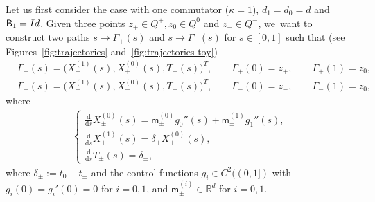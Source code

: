 \documentclass[10pt,a4paper]{amsart}
\theoremstyle{definition}
\newcommand\R{{\mathbb R}}
\newcommand{\sB}{{\mathsf B}}
\newcommand{\I}{\textup{Id}}\let\Id\I
\newcommand\ds{{\frac{\mathrm d}{\mathrm ds}}}
\begin{document}
Let us first consider the case with one commutator ($\kappa=1$),
$d_1=d_0=d$ and $\sB_1=\I$. Given three points
$z_+ \in Q^+, z_0 \in Q^0$ and $z_- \in Q^-$, we~want to
construct two paths $s \rightarrow \Gamma_+(s)$ and
$s \rightarrow \Gamma_-(s)$ for $s \in [0, 1]$ such that (see
Figures~\ref{fig:trajectories} and~\ref{fig:trajectories-toy})
\begin{equation*}
\begin{aligned}
& \Gamma_+(s) = \bigl(X^{(1)}_+(s), X^{(0)}_+(s),
T_+(s)\bigr)^T, \qquad \Gamma_+(0) = z_+, \qquad \Gamma_+(1) =
z_0,\\
& \Gamma_-(s) = \bigl(X^{(1)}_-(s), X^{(0)}_-(s),
T_-(s)\bigr)^T, \qquad \Gamma_-(0) = z_-, \qquad \Gamma_-(1) =
z_0,
\end{aligned}
\end{equation*}
where
\begin{equation}
\label{eq:control}
\begin{aligned}
\begin{cases}
\ds X^{(0)}_{\pm}(s)
= \mathsf m_\pm ^{(0)}
g_0''(s) +\mathsf m^{(1)}_\pm
g_1 ''(s), \\[2mm]
\ds X^{(1)}_\pm(s) = \delta_\pm X^{(0)}_\pm(s),\\[2mm]
\ds T_\pm(s) = \delta_\pm,
\end{cases}
\end{aligned}
\end{equation}
where $\delta_\pm := t_0 - t_\pm$ and the control functions
$g_i \in C^2((0,1])$ with $g_i(0)=g_i'(0)=0$ for $i=0,1$, and
$\mathsf m^{(i)} _\pm \in \R^d$ for $i=0,1$.
\end{document}
